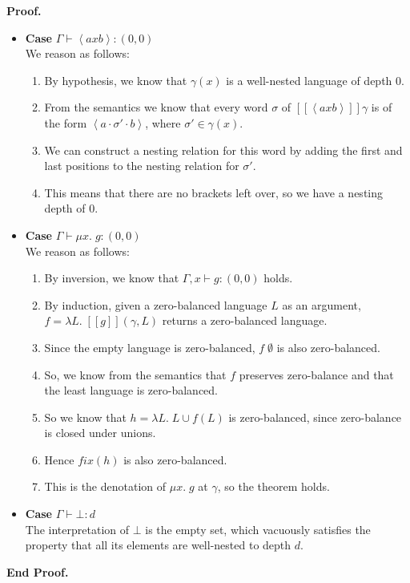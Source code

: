\documentclass{article}
\newcommand{\fix}[2]{\mu {#1}.\;{#2}}
\newcommand{\lft}[1]{\left<{#1}\right.}
\newcommand{\rgt}[1]{\left.{#1}\right>}
\newcommand{\judgebalance}[3][\Gamma]{{#1} \vdash {#2} : {#3}}
\newcommand{\zero}{(0,0)}
\newcommand{\interp}[1]{[\![{#1}]\!]}
\newcommand{\fun}[2]{\lambda {#1}.\;{#2}}
\newenvironment{proof}{\noindent\textbf{Proof.}}{\noindent\textbf{End Proof.}}
\newenvironment{caseblock}{\begin{itemize}}{\end{itemize}}
\newenvironment{case}[1]{\item \textbf{Case} {#1}\\}{}
\begin{document}
\begin{proof}
\begin{caseblock}
  \begin{case}{$\judgebalance{\lft{a}x\rgt{b}}{\zero}$}
    We reason as follows: 
    \begin{enumerate}
      \item By hypothesis, we know that $\gamma(x)$ is a well-nested language of depth 0. 
      \item From the semantics we know that every word $\sigma$ of $\interp{\lft{a}x\rgt{b}}\gamma$ is 
        of the form $\lft{a}\cdot\sigma'\cdot\rgt{b}$, where $\sigma' \in \gamma(x)$. 
      \item We can construct a nesting relation for this word by adding the first and last positions 
        to the nesting relation for $\sigma'$. 
      \item This means that there are no brackets left over, so we have a nesting depth of 0. 
    \end{enumerate}
  \end{case}

  \begin{case}{$\judgebalance{\fix{x}{g}}{\zero}$}
    We reason as follows: 
    \begin{enumerate}
      \item By inversion, we know that $\judgebalance[\Gamma, x]{g}{\zero}$ holds. 
      \item By induction, given a zero-balanced language $L$ as an argument, $f = \fun{L}{\interp{g}(\gamma,L)}$
        returns a zero-balanced language. 
      \item Since the empty language is zero-balanced, $f\;\emptyset$ is
        also zero-balanced. 
      \item So, we know from the semantics that $f$ preserves zero-balance and that the least language is zero-balanced. 
      \item So we know that $h = \fun{L}{L \cup f(L)}$ is zero-balanced, since zero-balance is closed under unions. 
      \item Hence $\mathit{fix}(h)$ is also zero-balanced. 
      \item This is the denotation of $\fix{x}{g}$ at $\gamma$, so the theorem holds. 
    \end{enumerate}
  \end{case}

  \begin{case}{$\judgebalance{\bot}{d}$}
    The interpretation of $\bot$ is the empty set, which vacuously satisfies the property that
    all its elements are well-nested to depth $d$. 
  \end{case}


\end{caseblock}
\end{proof}
\end{document}
